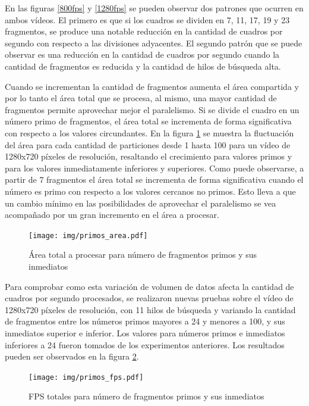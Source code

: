 En las figuras \ref{800fps} y \ref{1280fps} se pueden observar dos patrones que
ocurren en ambos vídeos. El primero es que si los cuadros se dividen en 7, 11,
17, 19 y 23 fragmentos, se produce una notable reducción en la cantidad de
cuadros por segundo con respecto a las divisiones adyacentes. El segundo patrón
que se puede observar es una reducción en la cantidad de cuadros por segundo
cuando la cantidad de fragmentos es reducida y la cantidad de hilos de búsqueda
alta.

Cuando se incrementan la cantidad de fragmentos aumenta el área compartida y por
lo tanto el área total que se procesa, al mismo, una mayor cantidad de
fragmentos permite aprovechar mejor el paralelismo. Si se divide el cuadro en un
número primo de fragmentos, el área total se incrementa de forma significativa
con respecto a los valores circundantes. En la figura \ref{primosArea} se
muestra la fluctuación del área para cada cantidad de particiones desde 1 hasta
100 para un vídeo de 1280x720 píxeles de resolución, resaltando el crecimiento
para valores primos y para los valores inmediatamente inferiores y superiores.
Como puede observarse, a partir de 7 fragmentos el área total se incrementa de
forma significativa cuando el número es primo con respecto a los valores
cercanos no primos. Esto lleva a que un cambio mínimo en las posibilidades de
aprovechar el paralelismo se vea acompañado por un gran incremento en el área a
procesar.

\begin{figure}[!h]

	\texttt{[image: img/primos\_area.pdf]}
	\caption{Área total a procesar para número de fragmentos primos y sus inmediatos}
	\label{primosArea}

\end{figure}

Para comprobar como esta variación de volumen de datos afecta la cantidad de
cuadros por segundo procesados, se realizaron nuevas pruebas sobre el vídeo de
1280x720 píxeles de resolución, con 11 hilos de búsqueda y variando la cantidad
de fragmentos entre los números primos mayores a 24 y menores a 100, y sus
inmediatos superior e inferior. Los valores para números primos e inmediatos
inferiores a 24 fueron tomados de los experimentos anteriores. Los resultados
pueden ser observados en la figura \ref{primosFPS}.

\begin{figure}[!h]

	\texttt{[image: img/primos\_fps.pdf]}
	\caption{FPS totales para número de fragmentos primos y sus inmediatos}
	\label{primosFPS}

\end{figure}

